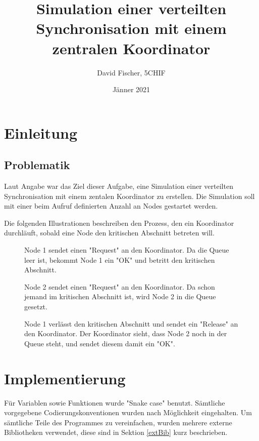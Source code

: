 \documentclass[12pt, letterpaper]{article}
\title{Simulation einer verteilten Synchronisation mit einem zentralen Koordinator}
\author{David Fischer, 5CHIF}
\date{Jänner 2021}
\begin{document}
\begin{titlepage}
\maketitle
\end{titlepage}

\tableofcontents
\newpage

\section{Einleitung}

\subsection{Problematik}
Laut Angabe war das Ziel dieser Aufgabe, eine Simulation einer verteilten Synchronisation mit einem zentalen Koordinator zu erstellen. Die Simulation soll mit einer beim Aufruf definierten Anzahl an Nodes gestartet werden.

Die folgenden Illustrationen beschreiben den Prozess, den ein Koordinator durchläuft, sobald eine Node den kritischen Abschnitt betreten will.

\begin{figure}[H]
    \centering
    \resizebox{0.4\textwidth}{!}{}
    \caption{Node 1 sendet einen "Request" an den Koordinator. Da die Queue leer ist, bekommt Node 1 ein "OK" und betritt den kritischen Abschnitt.}
    \label{fig:situation1}
\end{figure}

\begin{figure}[H]
    \centering
    \resizebox{0.4\textwidth}{!}{}
    \caption{Node 2 sendet einen "Request" an den Koordinator. Da schon jemand im kritischen Abschnitt ist, wird Node 2 in die Queue gesetzt.}
    \label{fig:situation2}
\end{figure}


\begin{figure}[H]
    \centering
    \resizebox{0.4\textwidth}{!}{}
    \caption{Node 1 verlässt den kritischen Abschnitt und sendet ein "Release" an den Koordinator. Der Koordinator sieht, dass Node 2 noch in der Queue steht, und sendet diesem damit ein "OK". }
    \label{fig:situation3}
\end{figure}

\section{Implementierung}
Für Variablen sowie Funktionen wurde "Snake case" benutzt. Sämtliche vorgegebene Codierungskonventionen wurden nach Möglichkeit eingehalten. Um sämtliche Teile des Programmes zu vereinfachen, wurden mehrere externe Bibliotheken verwendet, diese sind in Sektion \ref{extBib} kurz beschrieben. 
\end{document}
